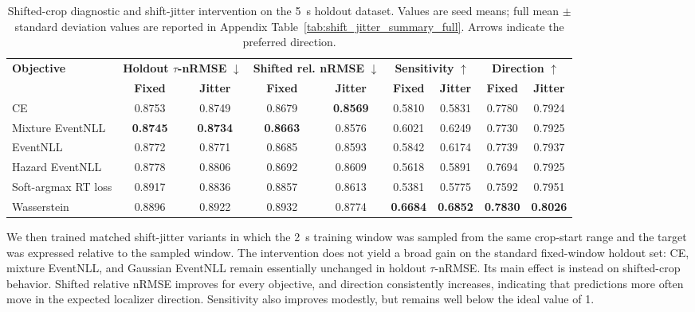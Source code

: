 \documentclass[12pt]{article}
\begin{document}
\begin{table}[!t]
\centering
\caption{Shifted-crop diagnostic and shift-jitter intervention on the 5~s holdout dataset. Values are seed means; full mean $\pm$ standard deviation values are reported in Appendix Table~\ref{tab:shift_jitter_summary_full}. Arrows indicate the preferred direction.}
\label{tab:shift_jitter_summary}
\footnotesize
\setlength{\tabcolsep}{3.5pt}
\renewcommand{\arraystretch}{1.12}
\begin{tabular}{@{} l c c c c c c c c @{}}
\toprule
\textbf{Objective} & \multicolumn{2}{c}{\textbf{Holdout \(\tau\)-nRMSE} $\downarrow$} & \multicolumn{2}{c}{\textbf{Shifted rel. nRMSE} $\downarrow$} & \multicolumn{2}{c}{\textbf{Sensitivity} $\uparrow$} & \multicolumn{2}{c}{\textbf{Direction} $\uparrow$} \\
\cmidrule(lr){2-3}\cmidrule(lr){4-5}\cmidrule(lr){6-7}\cmidrule(l){8-9}
 & \textbf{Fixed} & \textbf{Jitter} & \textbf{Fixed} & \textbf{Jitter} & \textbf{Fixed} & \textbf{Jitter} & \textbf{Fixed} & \textbf{Jitter} \\
\midrule
CE & 0.8753 & 0.8749 & 0.8679 & \textbf{0.8569} & 0.5810 & 0.5831 & 0.7780 & 0.7924 \\
Mixture EventNLL & \textbf{0.8745} & \textbf{0.8734} & \textbf{0.8663} & 0.8576 & 0.6021 & 0.6249 & 0.7730 & 0.7925 \\
EventNLL & 0.8772 & 0.8771 & 0.8685 & 0.8593 & 0.5842 & 0.6174 & 0.7739 & 0.7937 \\
Hazard EventNLL & 0.8778 & 0.8806 & 0.8692 & 0.8609 & 0.5618 & 0.5891 & 0.7694 & 0.7925 \\
Soft-argmax RT loss & 0.8917 & 0.8836 & 0.8857 & 0.8613 & 0.5381 & 0.5775 & 0.7592 & 0.7951 \\
Wasserstein & 0.8896 & 0.8922 & 0.8932 & 0.8774 & \textbf{0.6684} & \textbf{0.6852} & \textbf{0.7830} & \textbf{0.8026} \\
\bottomrule
\end{tabular}
\end{table}

We then trained matched shift-jitter variants in which the 2~s training window was sampled from the same crop-start range and the target was expressed relative to the sampled window. The intervention does not yield a broad gain on the standard fixed-window holdout set: CE, mixture EventNLL, and Gaussian EventNLL remain essentially unchanged in holdout \(\tau\)-nRMSE. Its main effect is instead on shifted-crop behavior. Shifted relative nRMSE improves for every objective, and direction consistently increases, indicating that predictions more often move in the expected localizer direction. Sensitivity also improves modestly, but remains well below the ideal value of 1.
\end{document}
